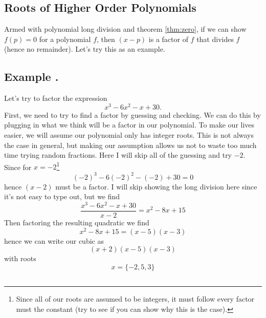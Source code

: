 \documentclass[11pt]{article}
\numberwithin{lemma}{section}
\numberwithin{equation}{section}
\numberwithin{define}{section}
\numberwithin{prop}{section}
\numberwithin{figure}{section}
\numberwithin{theorem}{section}
\newcounter{ex}[section]
\newenvironment{ex}[0]{

	\refstepcounter{ex}
    \subsection*{Example \theex .}
    }
    {
    \subsection*{}
    }
\numberwithin{ex}{section}
\begin{document}
\subsection{Roots of Higher Order Polynomials}
Armed with polynomial long division and theorem \eqref{thm:zero}, if we can show $f(p)=0$ for a polynomial $f$, then $(x-p)$ is a factor of $f$ that divides $f$ (hence no remainder).
Let's try this as an example.

\begin{ex}
	Let's try to factor the expression 
	$$x^3-6x^2-x+30.$$
	First, we need to try to find a factor by guessing and checking. 
	We can do this by plugging in what we think will be a factor in our polynomial. To make our lives easier, we will assume our polynomial only has integer roots.
	This is not always the case in general, but making our assumption allows us not to waste too much time trying random fractions.
	Here I will skip all of the guessing and try $-2$. Since for $x=-2$\footnote{
	Since all of our roots are assumed to be integers, it must follow every factor must the constant (try to see if you can show why this is the case).}
	$$(-2)^3-6(-2)^2-(-2)+30=0$$
	hence $(x-2)$ must be a factor.
	I will skip showing the long division here since it's not easy to type out, but we find
	$$\frac{x^3-6x^2-x+30}{x-2}=x^2-8x+15$$
	Then factoring the resulting quadratic we find
	$$x^2-8x+15=(x-5)(x-3)$$
	hence we can write our cubic as
	$$(x+2)(x-5)(x-3)$$
	with roots
	$$x=\{-2,5,3\}$$
\end{ex}
\end{document}
